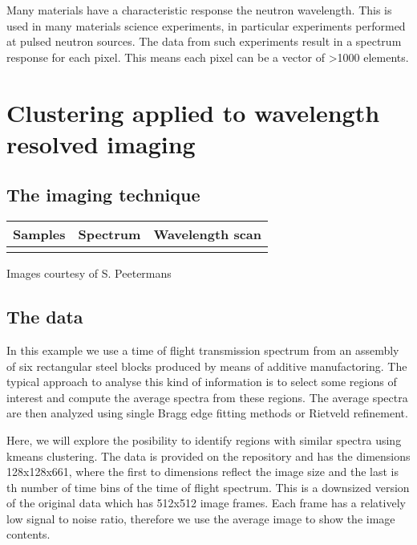 \documentclass[letterpaper,10pt,english]{sphinxmanual}
\begin{document}
Many materials have a characteristic response the neutron wavelength. This is used in many materials science experiments, in particular experiments performed at pulsed neutron sources. The data from such experiments result in a spectrum response for each pixel. This means each pixel can be a vector of \textgreater{}1000 elements.


\section{Clustering applied to wavelength resolved imaging}
\label{\detokenize{ML4NeutronImageSegmentation:clustering-applied-to-wavelength-resolved-imaging}}

\subsection{The imaging technique}
\label{\detokenize{ML4NeutronImageSegmentation:the-imaging-technique}}

\begin{savenotes}\sphinxattablestart
\centering
\begin{tabulary}{\linewidth}[t]{|T|T|T|}
\hline
\sphinxstyletheadfamily 
Samples
&\sphinxstyletheadfamily 
Spectrum
&\sphinxstyletheadfamily 
Wavelength scan
\\
\hline
{}
&
&
\\
\hline
\end{tabulary}
\par
\sphinxattableend\end{savenotes}

Images courtesy of S. Peetermans


\subsection{The data}
\label{\detokenize{ML4NeutronImageSegmentation:the-data}}
In this example we use a time of flight transmission spectrum from an assembly of six rectangular steel blocks produced by means of additive manufactoring. The typical approach to analyse this kind of information is to select some regions of interest and compute the average spectra from these regions. The average spectra are then analyzed using single Bragg edge fitting methods or Rietveld refinement.

Here, we will explore the posibility to identify regions with similar spectra using k\sphinxhyphen{}means clustering. The data is provided on the repository and has the dimensions 128x128x661, where the first to dimensions reflect the image size and the last is th number of time bins of the time of flight spectrum. This is a downsized version of the original data which has 512x512 image frames. Each frame has a relatively low signal to noise ratio, therefore we use the average image  to show the image contents.
\end{document}
